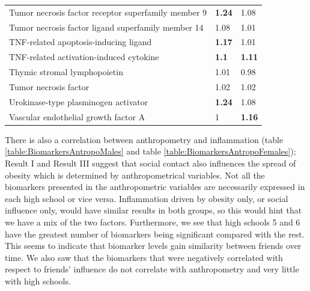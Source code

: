 \begin{table}[ht]
\begin{tabular}{lll}
\rowcolor[HTML]{EFEFEF} 
Tumor necrosis factor receptor superfamily member 9          & {\color[HTML]{009901} \textbf{1.24}} & {\color[HTML]{C0C0C0} 1.08}          \\
\rowcolor[HTML]{EFEFEF} 
Tumor necrosis factor ligand superfamily member 14           & {\color[HTML]{C0C0C0} 1.08}          & {\color[HTML]{C0C0C0} 1.01}          \\
\rowcolor[HTML]{EFEFEF} 
TNF-related apoptosis-inducing ligand                        & {\color[HTML]{009901} \textbf{1.17}} & {\color[HTML]{C0C0C0} 1.01}          \\
\rowcolor[HTML]{EFEFEF} 
TNF-related activation-induced cytokine                      & {\color[HTML]{009901} \textbf{1.1}}  & {\color[HTML]{009901} \textbf{1.11}} \\
Thymic stromal lymphopoietin                                 & {\color[HTML]{C0C0C0} 1.01}          & {\color[HTML]{C0C0C0} 0.98}          \\
Tumor necrosis factor                                        & {\color[HTML]{C0C0C0} 1.02}          & {\color[HTML]{C0C0C0} 1.02}          \\
Urokinase-type plasminogen activator                         & {\color[HTML]{009901} \textbf{1.24}} & {\color[HTML]{C0C0C0} 1.08}          \\
Vascular endothelial growth factor A                         & {\color[HTML]{C0C0C0} 1}             & {\color[HTML]{009901} \textbf{1.16}}
\end{tabular}
\label{table:Result1Friends4}
\end{table}

There is also a correlation between anthropometry and inflammation (table \ref{table:BiomarkersAntropoMales} and table \ref{table:BiomarkersAntropoFemales}); Result I and Result III suggest that social contact also influences the spread of obesity which is determined by anthropometrical variables. Not all the biomarkers presented in the anthropometric variables are necessarily expressed in each high school or vice versa. Inflammation driven by obesity only, or social influence only, would have similar results in both groups, so this would hint that we have a mix of the two factors. Furthermore, we see that high schools 5 and 6 have the greatest number of biomarkers being significant compared with the rest. This seems to indicate that biomarker levels gain similarity between friends over time. We also saw that the biomarkers that were negatively correlated with respect to friends' influence do not correlate with anthropometry and very little with high schools. 

